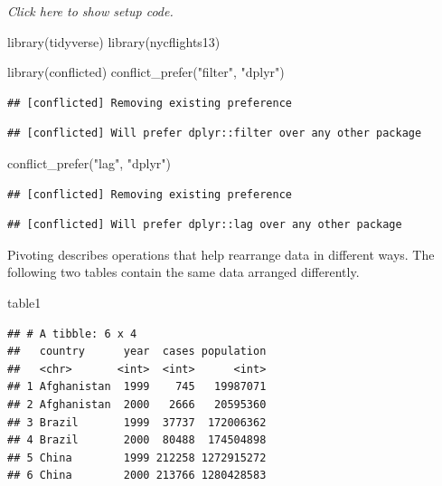 \documentclass[]{book}
\newenvironment{Shaded}{}{}
\newcommand{\KeywordTok}[1]{\textcolor[rgb]{0.00,0.00,1.00}{#1}}
\newcommand{\NormalTok}[1]{#1}
\newcommand{\StringTok}[1]{\textcolor[rgb]{0.00,0.50,0.50}{#1}}
\begin{document}
\emph{Click here to show setup code.}

\begin{Shaded}
\begin{Highlighting}[]
\KeywordTok{library}\NormalTok{(tidyverse)}
\KeywordTok{library}\NormalTok{(nycflights13)}

\KeywordTok{library}\NormalTok{(conflicted)}
\KeywordTok{conflict_prefer}\NormalTok{(}\StringTok{"filter"}\NormalTok{, }\StringTok{"dplyr"}\NormalTok{)}
\end{Highlighting}
\end{Shaded}

\begin{verbatim}
## [conflicted] Removing existing preference
\end{verbatim}

\begin{verbatim}
## [conflicted] Will prefer dplyr::filter over any other package
\end{verbatim}

\begin{Shaded}
\begin{Highlighting}[]
\KeywordTok{conflict_prefer}\NormalTok{(}\StringTok{"lag"}\NormalTok{, }\StringTok{"dplyr"}\NormalTok{)}
\end{Highlighting}
\end{Shaded}

\begin{verbatim}
## [conflicted] Removing existing preference
\end{verbatim}

\begin{verbatim}
## [conflicted] Will prefer dplyr::lag over any other package
\end{verbatim}

Pivoting describes operations that help rearrange data in different ways.
The following two tables contain the same data arranged differently.

\begin{Shaded}
\begin{Highlighting}[]
\NormalTok{table1}
\end{Highlighting}
\end{Shaded}

\begin{verbatim}
## # A tibble: 6 x 4
##   country      year  cases population
##   <chr>       <int>  <int>      <int>
## 1 Afghanistan  1999    745   19987071
## 2 Afghanistan  2000   2666   20595360
## 3 Brazil       1999  37737  172006362
## 4 Brazil       2000  80488  174504898
## 5 China        1999 212258 1272915272
## 6 China        2000 213766 1280428583
\end{verbatim}
\end{document}

